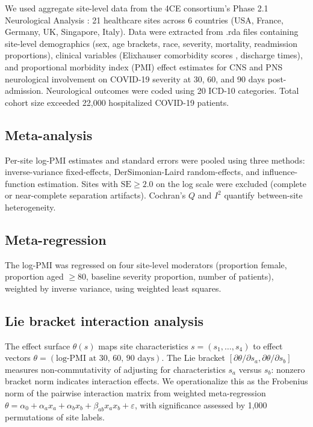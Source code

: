 \documentclass{article}
\begin{document}
We used aggregate site-level data from the 4CE consortium's Phase 2.1 Neurological Analysis \cite{four_ce_neuro2021, chou20224ce}: 21 healthcare sites across 6 countries (USA, France, Germany, UK, Singapore, Italy). Data were extracted from .rda files containing site-level demographics (sex, age brackets, race, severity, mortality, readmission proportions), clinical variables (Elixhauser comorbidity scores \cite{elixhauser1998}, discharge times), and proportional morbidity index (PMI) effect estimates for CNS and PNS neurological involvement on COVID-19 severity at 30, 60, and 90 days post-admission. Neurological outcomes were coded using 20 ICD-10 categories. Total cohort size exceeded 22,000 hospitalized COVID-19 patients.

\subsection{Meta-analysis}

Per-site log-PMI estimates and standard errors were pooled using three methods: inverse-variance fixed-effects, DerSimonian-Laird random-effects, and influence-function estimation. Sites with $\text{SE} \geq 2.0$ on the log scale were excluded (complete or near-complete separation artifacts). Cochran's $Q$ and $I^2$ quantify between-site heterogeneity.

\subsection{Meta-regression}

The log-PMI was regressed on four site-level moderators (proportion female, proportion aged $\geq 80$, baseline severity proportion, number of patients), weighted by inverse variance, using weighted least squares.

\subsection{Lie bracket interaction analysis}

The effect surface $\theta(s)$ maps site characteristics $s = (s_1, \ldots, s_4)$ to effect vectors $\theta = (\text{log-PMI at 30, 60, 90 days})$. The Lie bracket $[\partial\theta/\partial s_a, \partial\theta/\partial s_b]$ measures non-commutativity of adjusting for characteristics $s_a$ versus $s_b$: nonzero bracket norm indicates interaction effects. We operationalize this as the Frobenius norm of the pairwise interaction matrix from weighted meta-regression $\theta = \alpha_0 + \alpha_a x_a + \alpha_b x_b + \beta_{ab} x_a x_b + \varepsilon$, with significance assessed by 1,000 permutations of site labels.
\end{document}
